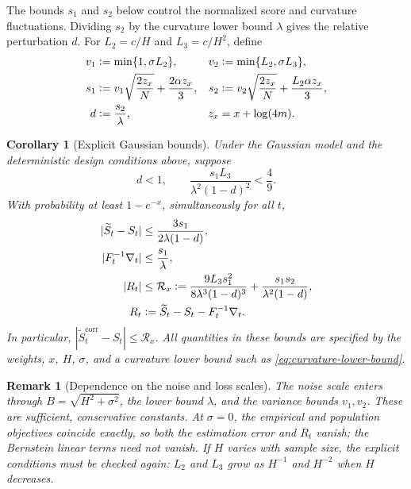 \documentclass[11pt]{article}
\newcommand{\eqdef}{\mathrel{\vcentcolon=}}
\newtheorem{corollary}[proposition]{Corollary}
\newtheorem*{remark}{Remark}
\begin{document}
The bounds \(s_1\) and \(s_2\) below control the normalized score and
curvature fluctuations.  Dividing \(s_2\) by the curvature lower bound
\(\lambda\) gives the relative perturbation \(d\).  For
\(L_2=c/H\) and \(L_3=c/H^2\), define
\begin{align}
  v_1&\eqdef\min\{1,\sigma L_2\},&
  v_2&\eqdef\min\{L_2,\sigma L_3\},\notag\\
  s_1&\eqdef v_1\sqrt{\frac{2z_x}{N}}+\frac{2\alpha z_x}{3},&
  s_2&\eqdef v_2\sqrt{\frac{2z_x}{N}}+\frac{L_2\alpha z_x}{3},\notag\\
  d&\eqdef\frac{s_2}{\lambda},&
  z_x&=x+\log(4m).
  \label{eq:gaussian-tail-constants}
\end{align}

\begin{corollary}[Explicit Gaussian bounds]\label{cor:gaussian}
Under the Gaussian model and the deterministic design conditions above, suppose
\begin{equation}
  d<1,\qquad
  \frac{s_1L_3}{\lambda^2(1-d)^2}<\frac49.
  \label{eq:gaussian-smallness}
\end{equation}
With probability at least \(1-e^{-x}\), simultaneously for all \(t\),
\begin{align}
  |\widetilde S_t-S_t|
    &\leq\frac{3s_1}{2\lambda(1-d)},
      \label{eq:gaussian-raw}\\
  |F_t^{-1}\nabla_t|&\leq\frac{s_1}{\lambda},
      \label{eq:gaussian-leading}\\
  |R_t|&\leq\mathcal R_x
     \eqdef\frac{9L_3s_1^2}{8\lambda^3(1-d)^3}
            +\frac{s_1s_2}{\lambda^2(1-d)},
      \label{eq:gaussian-remainder}\\
  R_t&\eqdef\widetilde S_t-S_t-F_t^{-1}\nabla_t.
      \notag
\end{align}
In particular, \(|\widetilde S_t^{\mathrm{corr}}-S_t|\leq\mathcal R_x\).
All quantities in these bounds are specified by the weights, \(x\), \(H\),
\(\sigma\), and a curvature lower bound such as \eqref{eq:curvature-lower-bound}.
\end{corollary}


\begin{remark}[Dependence on the noise and loss scales]
The noise scale enters through \(B=\sqrt{H^2+\sigma^2}\), the lower bound
\(\lambda\), and the variance bounds \(v_1,v_2\).  These are sufficient,
conservative constants.  At \(\sigma=0\), the empirical and population
objectives coincide exactly, so both the estimation error and \(R_t\) vanish;
the Bernstein linear terms need not vanish.  If \(H\) varies with sample size,
the explicit conditions must be checked again: \(L_2\) and \(L_3\) grow as
\(H^{-1}\) and \(H^{-2}\) when \(H\) decreases.
\end{remark}
\end{document}
